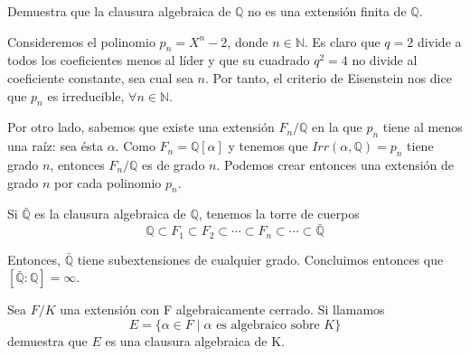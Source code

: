 \documentclass[a4paper, 11pt]{article}
\begin{document}
  \newpage

  \begin{ejercicio}
      Demuestra que la clausura algebraica de $\mathbb{Q}$ no es una extensión finita de $\mathbb{Q}$.
  \end{ejercicio}

  \begin{solucion}
      Consideremos el polinomio $p_n = X^n-2$, donde $n\in\mathbb{N}$. Es claro que $q=2$ divide a todos los coeficientes menos al líder y que su cuadrado $q^2=4$ no divide al coeficiente constante, sea cual sea $n$. Por tanto, el criterio de Eisenstein nos dice que $p_n$ es irreducible, $\forall n \in \mathbb{N}$.

      Por otro lado, sabemos que existe una extensión $F_n/\mathbb{Q}$ en la que $p_n$ tiene al menos una raíz: sea ésta $\alpha$. Como $F_n=\mathbb{Q}[\alpha]$ y tenemos que $Irr(\alpha,\mathbb{Q}) = p_n$ tiene grado $n$, entonces $F_n/\mathbb{Q}$ es de grado $n$. Podemos crear entonces una extensión de grado $n$ por cada polinomio $p_n$.

      Si $\bar{\mathbb{Q}}$ es la clausura algebraica de $\mathbb{Q}$, tenemos la torre de cuerpos
      \[
      \mathbb{Q} \subset F_1 \subset F_2 \subset \cdots \subset F_n \subset \cdots \subset \bar{\mathbb{Q}}
      \]

      Entonces, $\bar{\mathbb{Q}}$ tiene subextensiones de cualquier grado. Concluimos entonces que $[\bar{\mathbb{Q}}:\mathbb{Q}] = \infty$.
  \end{solucion}

  \begin{ejercicio}
      Sea $F/K$ una extensión con F algebraicamente cerrado. Si llamamos
      \[
      E = \{\alpha\in F \;|\; \text{$\alpha$ es algebraico sobre $K$}\}
      \]
      demuestra que $E$ es una clausura algebraica de K.
  \end{ejercicio}
\end{document}
